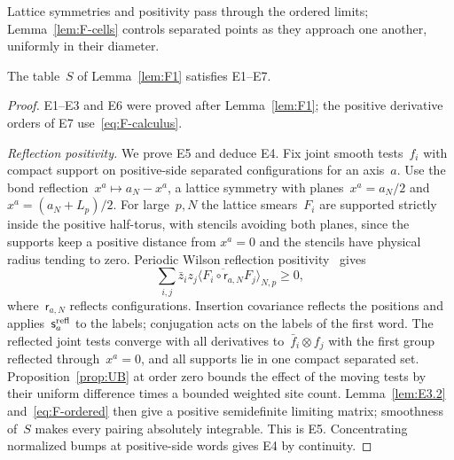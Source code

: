 Lattice symmetries and positivity pass through the ordered limits; Lemma~\ref{lem:F-cells} controls separated points as they approach one another, uniformly in their diameter.
\begin{lemma}\label{lem:F3}
The table~$S$ of Lemma~\ref{lem:F1} satisfies E1--E7.
\end{lemma}
\begin{proof}
E1--E3 and E6 were proved after Lemma~\ref{lem:F1}; the positive derivative orders of E7 use~\eqref{eq:F-calculus}.

\emph{Reflection positivity.} We prove E5 and deduce E4. Fix joint smooth tests~$f_i$ with compact support on positive-side separated configurations for an axis~$a$. Use the bond reflection~$x^a\mapsto a_N-x^a$, a lattice symmetry with planes~$x^a=a_N/2$ and~$x^a=(a_N+L_p)/2$. For large~$p,N$ the lattice smears~$F_i$ are supported strictly inside the positive half-torus, with stencils avoiding both planes, since the supports keep a positive distance from $x^a=0$ and the stencils have physical radius tending to zero. Periodic Wilson reflection positivity~\cite[Theorem~2.1, pp.~14--15]{Seiler1982} gives
\begin{equation*}
\sum_{i,j}\bar z_i z_j\langle\overline{F_i\circ\mathsf r_{a,N}}F_j\rangle_{N,p}\ge0,
\end{equation*}
where~$\mathsf r_{a,N}$ reflects configurations. Insertion covariance reflects the positions and applies~$\mathsf s_a^{\rm refl}$ to the labels; conjugation acts on the labels of the first word. The reflected joint tests converge with all derivatives to~$\bar f_i\otimes f_j$ with the first group reflected through~$x^a=0$, and all supports lie in one compact separated set. Proposition~\ref{prop:UB} at order zero bounds the effect of the moving tests by their uniform difference times a bounded weighted site count. Lemma~\ref{lem:E3.2} and~\eqref{eq:F-ordered} then give a positive semidefinite limiting matrix; smoothness of~$S$ makes every pairing absolutely integrable. This is E5. Concentrating normalized bumps at positive-side words gives E4 by continuity.


\end{proof}
